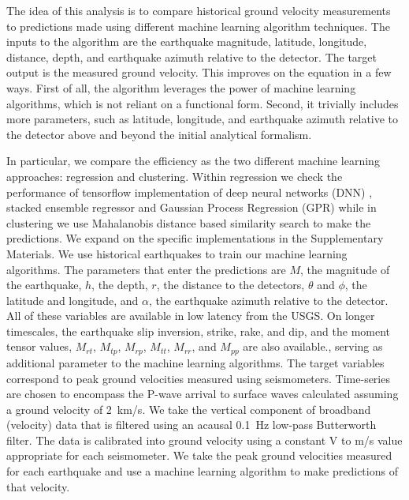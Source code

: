 \documentclass[preprint, aps, showpacs]{revtex4-1}
\begin{document}
The idea of this analysis is to compare historical ground velocity measurements to predictions made using different machine learning algorithm techniques. 
The inputs to the algorithm are the earthquake magnitude, latitude, longitude, distance, depth, and earthquake azimuth relative to the detector. 
The target output is the measured ground velocity.
This improves on the equation in a few ways.
First of all, the algorithm leverages the power of machine learning algorithms, which is not reliant on a functional form.
Second, it trivially includes more parameters, such as latitude, longitude, and earthquake azimuth relative to the detector above and beyond the initial analytical formalism. 

In particular, we compare the efficiency as the two different machine learning approaches: regression and clustering. Within regression we check the performance of tensorflow implementation of deep neural networks (DNN) \citep{Abadi:2016:TSL:3026877.3026899}, stacked ensemble regressor \citep{wolpert1992stacked,van2007super} and Gaussian Process Regression (GPR) \citep{rasmussen2006gaussian} while in clustering we use Mahalanobis distance \citep{Mahalanobis} based similarity search to make the predictions.
We expand on the specific implementations in the Supplementary Materials.
We use historical earthquakes to train our machine learning algorithms. The parameters that enter the predictions are $M$, the magnitude of the earthquake, $h$, the depth, $r$, the distance to the detectors, $\theta$ and $\phi$, the latitude and longitude, and $\alpha$, the earthquake azimuth relative to the detector.
All of these variables are available in low latency from the USGS.
On longer timescales, the earthquake slip inversion, strike, rake, and dip, and the moment tensor values, $M_{rt}$, $M_{tp}$, $M_{rp}$, $M_{tt}$, $M_{rr}$, and $M_{pp}$ are also available., serving as additional parameter to the machine learning algorithms. The target variables correspond to peak ground velocities measured using seismometers.
Time-series are chosen to encompass the P-wave arrival to surface waves calculated assuming a ground velocity of 2\, km/s.
We take the vertical component of broadband (velocity) data that is filtered using an acausal 0.1\, Hz low-pass Butterworth filter.
The data is calibrated into ground velocity using a constant V to m/s value appropriate for each seismometer.
We take the peak ground velocities measured for each earthquake and use a machine learning algorithm to make predictions of that velocity.
\end{document}
